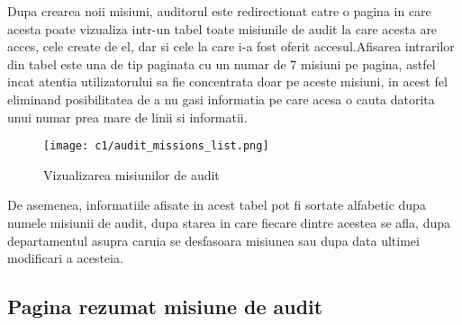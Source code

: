 Dupa crearea noii misiuni, auditorul este redirectionat catre o pagina in care acesta poate vizualiza intr-un tabel toate misiunile de audit la care acesta are acces, cele create de el, dar si cele la care i-a fost oferit accesul.Afisarea intrarilor din tabel este una de tip paginata cu un numar de 7 misiuni pe pagina, astfel incat atentia utilizatorului sa fie concentrata doar pe aceste misiuni, in acest fel eliminand posibilitatea de a nu gasi informatia pe care acesa o cauta datorita unui numar prea mare de linii si informatii.
	\vspace{0.5 cm}
\begin{figure}[h]
	\centering
	
	\texttt{[image: c1/audit\_missions\_list.png]}
	\caption{Vizualizarea misiunilor de audit}
\end{figure}
De asemenea, informatiile afisate in acest tabel pot fi sortate alfabetic dupa numele misiunii de audit, dupa starea in care fiecare dintre acestea se afla, dupa departamentul asupra caruia se desfasoara misiunea  sau dupa data ultimei modificari a acesteia.

\subsection{Pagina rezumat misiune de audit}


